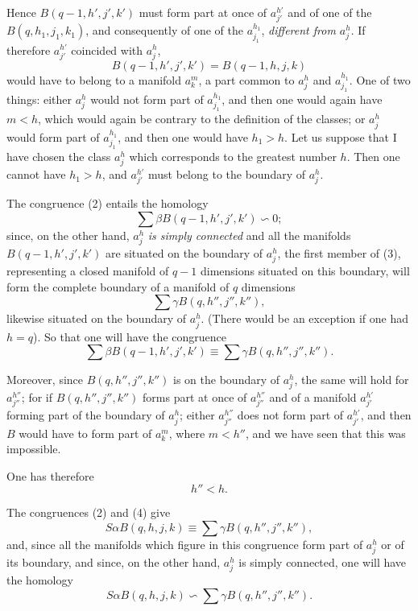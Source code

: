 \documentclass{article}
\begin{document}

Hence $B(q - 1, h', j', k')$ must form part at once of $a^{h'}_{j'}$ and of one of the $B(q, h_{1}, j_{1}, k_{1})$, and consequently of one of the $a^{h_{1}}_{j_{1}}$, \emph{different from $a^{h}_{j}$}. If therefore $a^{h'}_{j'}$ coincided with $a^{h}_{j}$,
\[ B(q - 1, h', j', k') = B(q - 1, h, j, k) \]
would have to belong to a manifold $a^{m}_{k}$, a part common to $a^{h}_{j}$ and $a^{h_{1}}_{j_{1}}$. One of two things: either $a^{h}_{j}$ would not form part of $a^{h_{1}}_{j_{1}}$, and then one would again have $m < h$, which would again be contrary to the definition of the classes; or $a^{h}_{j}$ would form part of $a^{h_{1}}_{j_{1}}$, and then one would have $h_{1} > h$. Let us suppose that I have chosen the class $a^{h}_{j}$ which corresponds to the greatest number $h$. Then one cannot have $h_{1} > h$, and $a^{h'}_{j'}$ must belong to the boundary of $a^{h}_{j}$.

The congruence (2) entails the homology
\[ \sum \beta B(q - 1, h', j', k') \backsim 0; \tag{3} \]
since, on the other hand, $a^{h}_{j}$ \emph{is simply connected} and all the manifolds $B(q - 1, h', j', k')$ are situated on the boundary of $a^{h}_{j}$, the first member of (3), representing a closed manifold of $q - 1$ dimensions situated on this boundary, will form the complete boundary of a manifold of $q$ dimensions
\[ \sum \gamma B(q, h'', j'', k''), \]
likewise situated on the boundary of $a^{h}_{j}$. (There would be an exception if one had $h = q$). So that one will have the congruence
\[ \sum \beta B(q - 1, h', j', k') \equiv \sum \gamma B(q, h'', j'', k''). \tag{4} \]

Moreover, since $B(q, h'', j'', k'')$ is on the boundary of $a^{h}_{j}$, the same will hold for $a^{h''}_{j''}$; for if $B(q, h'', j'', k'')$ forms part at once of $a^{h''}_{j''}$ and of a manifold $a^{h'}_{j'}$ forming part of the boundary of $a^{h}_{j}$; either $a^{h''}_{j''}$ does not form part of $a^{h'}_{j'}$, and then $B$ would have to form part of $a^{m}_{k}$, where $m < h''$, and we have seen that this was impossible.


One has therefore
\[ h'' < h. \]

The congruences (2) and (4) give
\[ S \alpha B(q, h, j, k) \equiv \sum \gamma B(q, h'', j'', k''), \]
and, since all the manifolds which figure in this congruence form part of $a^{h}_{j}$ or of its boundary, and since, on the other hand, $a^{h}_{j}$ is simply connected, one will have the homology
\[ S \alpha B(q, h, j, k) \backsim \sum \gamma B(q, h'', j'', k''). \]
\end{document}
